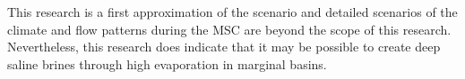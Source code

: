 \documentclass[twocolumn]{article}
\begin{document}
This research is a first approximation of the scenario and detailed scenarios of the climate and flow patterns during the MSC are beyond the scope of this research. Nevertheless, this research does indicate that it may be possible to create deep saline brines through high evaporation in marginal basins.





\end{document}
